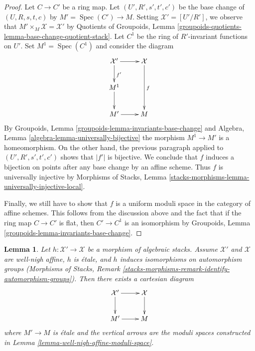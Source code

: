 \documentclass{stacks-project}
\theoremstyle{plain}
\newtheorem{lemma}[subsection]{Lemma}
\theoremstyle{definition}
\theoremstyle{remark}
\numberwithin{equation}{subsection}
\def\Spec{\mathop{\mathrm{Spec}}}
\begin{document}
\begin{proof}
\medskip\noindent
Let $C \to C'$ be a ring map. Let $(U', R', s', t', c')$ be
the base change of $(U, R, s, t, c)$ by $M' = \Spec(C') \to M$.
Setting $\mathcal{X}' = [U'/R']$, we observe that
$M' \times_M \mathcal{X} = \mathcal{X}'$ by
Quotients of Groupoids, Lemma
\ref{groupoids-quotients-lemma-base-change-quotient-stack}.
Let $C^1$ be the ring of $R'$-invariant functions on $U'$.
Set $M^1 = \Spec(C^1)$ and consider the diagram
$$
\xymatrix{
\mathcal{X}' \ar[d]^{f'} \ar[r] & \mathcal{X} \ar[dd]^f \\
M^1 \ar[d] \\
M' \ar[r] & M
}
$$
By Groupoids, Lemma \ref{groupoids-lemma-invariants-base-change} and
Algebra, Lemma \ref{algebra-lemma-universally-bijective}
the morphism $M^1 \to M'$ is a homeomorphism.
On the other hand, the previous paragraph applied to
$(U', R', s', t', c')$ shows that $|f'|$ is bijective.
We conclude that $f$ induces a bijection on points after any
base change by an affine scheme. Thus $f$ is universally injective
by Morphisms of Stacks, Lemma
\ref{stacks-morphisms-lemma-universally-injective-local}.

\medskip\noindent
Finally, we still have to show that $f$ is a uniform moduli space
in the category of affine schemes. This follows from the discussion
above and the fact that if the
ring map $C \to C'$ is flat, then $C' \to C^1$ is an isomorphism
by Groupoids, Lemma \ref{groupoids-lemma-invariants-base-change}.
\end{proof}

\begin{lemma}
\label{lemma-well-nigh-affine-moduli-space-etale}
Let $h : \mathcal{X}' \to \mathcal{X}$ be a morphism of algebraic stacks.
Assume $\mathcal{X}'$ and $\mathcal{X}$ are well-nigh affine,
$h$ is \'etale, and $h$ induces isomorphisms on automorphism groups
(Morphisms of Stacks, Remark
\ref{stacks-morphisms-remark-identify-automorphism-groups}).
Then there exists a cartesian diagram
$$
\xymatrix{
\mathcal{X}' \ar[d] \ar[r] & \mathcal{X} \ar[d] \\
M' \ar[r] & M
}
$$
where $M' \to M$ is \'etale and
the vertical arrows are the moduli spaces constructed in
Lemma \ref{lemma-well-nigh-affine-moduli-space}.
\end{lemma}
\end{document}
